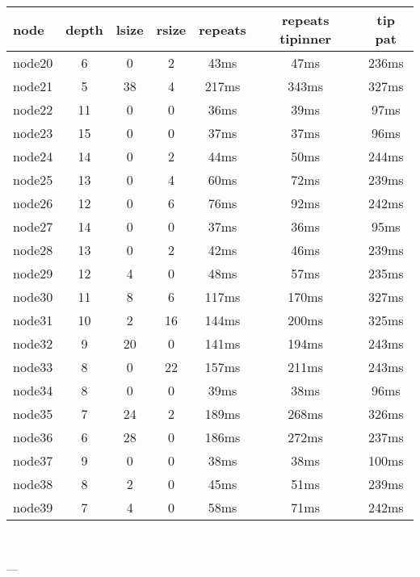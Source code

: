 \begin{tabular}{|l|c|c|c|c|c|c|}
\hline node & depth & lsize & rsize  & repeats & repeats tipinner & tip pat\\
    \hline node20 & 6 & 0 & 2 & 43ms & 47ms & 236ms\\
    \hline node21 & 5 & 38 & 4 & 217ms & 343ms & 327ms\\
    \hline node22 & 11 & 0 & 0 & 36ms & 39ms & 97ms\\
    \hline node23 & 15 & 0 & 0 & 37ms & 37ms & 96ms\\
    \hline node24 & 14 & 0 & 2 & 44ms & 50ms & 244ms\\
    \hline node25 & 13 & 0 & 4 & 60ms & 72ms & 239ms\\
    \hline node26 & 12 & 0 & 6 & 76ms & 92ms & 242ms\\
    \hline node27 & 14 & 0 & 0 & 37ms & 36ms & 95ms\\
    \hline node28 & 13 & 0 & 2 & 42ms & 46ms & 239ms\\
    \hline node29 & 12 & 4 & 0 & 48ms & 57ms & 235ms\\
    \hline node30 & 11 & 8 & 6 & 117ms & 170ms & 327ms\\
    \hline node31 & 10 & 2 & 16 & 144ms & 200ms & 325ms\\
    \hline node32 & 9 & 20 & 0 & 141ms & 194ms & 243ms\\
    \hline node33 & 8 & 0 & 22 & 157ms & 211ms & 243ms\\
    \hline node34 & 8 & 0 & 0 & 39ms & 38ms & 96ms\\
    \hline node35 & 7 & 24 & 2 & 189ms & 268ms & 326ms\\
    \hline node36 & 6 & 28 & 0 & 186ms & 272ms & 237ms\\
    \hline node37 & 9 & 0 & 0 & 38ms & 38ms & 100ms\\
    \hline node38 & 8 & 2 & 0 & 45ms & 51ms & 239ms\\
    \hline node39 & 7 & 4 & 0 & 58ms & 71ms & 242ms\\

\hline
\end{tabular} \

---


